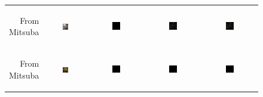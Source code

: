 \begin{figure}[t!bp]
\begin{tabular}{@{}r@{ } c@{ } c@{ } c@{ } c }
		\begin{sideways} \parbox[b]{20mm} {\small{From\\ Mitsuba}} \end{sideways} &
		\includegraphics[width=0.15\textwidth]{figs/4_results/veach-bidir/1_from_mitsuba} &
		\includegraphics[width=0.15\textwidth]{figs/4_results/veach-bidir/diff_mitsuba-pbrt.png} &
		\includegraphics[width=0.15\textwidth]{figs/4_results/veach-bidir/diff_mitsuba-lux.png} &
		\includegraphics[width=0.15\textwidth]{figs/4_results/veach-bidir/diff_pbrt-lux.png} \\
		
		\begin{sideways} \parbox[b]{20mm} {\small{From\\ Mitsuba}} \end{sideways} &
		\includegraphics[width=0.15\textwidth]{figs/4_results/cornell-box/1_from_mitsuba.png} &
		\includegraphics[width=0.15\textwidth]{figs/4_results/cornell-box/diff_mitsuba-pbrt.png} &
		\includegraphics[width=0.15\textwidth]{figs/4_results/cornell-box/diff_mitsuba-lux.png} &
		\includegraphics[width=0.15\textwidth]{figs/4_results/cornell-box/diff_pbrt-lux.png} \\
		

\end{tabular}
\end{figure}
